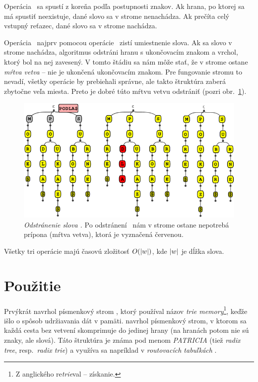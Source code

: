 Operácia \find\ sa spustí z koreňa podľa postupnosti znakov. Ak hrana, 
po ktorej sa má spustiť neexistuje, dané slovo sa v strome nenachádza. 
Ak prečíta celý vstupný reťazec, dané slovo sa v strome nachádza.

Operácia \delete\ najprv pomocou operácie \find\ zistí umiestnenie slova. 
Ak sa slovo v strome nachádza, algoritmus odstráni hranu s ukončovacím 
znakom a vrchol, ktorý bol na nej zavesený. V tomto štádiu sa nám môže 
stať, že v strome ostane \emph{mŕtva vetva} -- nie je ukončená 
ukončovacím znakom. Pre fungovanie stromu to nevadí, všetky operácie by 
prebiehali správne, ale takto štruktúra zaberá zbytočne veľa miesta. 
Preto je dobré túto mŕtvu vetvu odstrániť (pozri obr.~\ref{img:triedelete}).

\begin{figure}
\includegraphics[width=\columnwidth]{obrazky/triedeletesmall.png}
\caption{\emph{Odstránenie slova .} Po odstránení 
\uz\ nám v strome ostane nepotrebá prípona  (mŕtva vetva), 
ktorá je vyznačená červenou.}
\label{img:triedelete} 
\end{figure}

Všetky tri operácie majú časovú 
zložitosť $O(|w|)$, kde $|w|$ je dĺžka slova.

\section{Použitie}
Prvýkrát navrhol písmenkový strom \citet{fredkin}, ktorý používal názov 
\emph{trie memory}\footnote{Z anglického re\emph{trie}val -- získanie.}, 
keďže išlo o spôsob udržiavania dát v pamäti. 
\citet{patricia} navrhol písmenkový strom, v ktorom sa každá cesta bez vetvení
skomprimuje do jedinej hrany (na hranách potom nie sú znaky, ale slová).
Táto štruktúra je známa pod menom \emph{PATRICIA} (tiež \emph{radix tree},
resp.\ \emph{radix trie}) a využíva sa napríklad v \emph{routovacích tabuľkách}
\citep{radix}.

